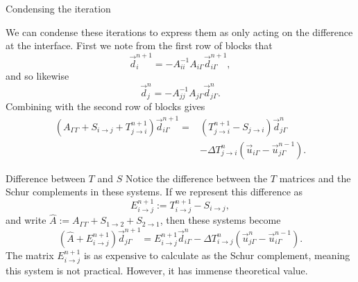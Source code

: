 \documentclass{beamer}
\begin{document}
\begin{frame}{Condensing the iteration}

We can condense these iterations to express them as only acting on the difference at the interface.
First we note from the first row of blocks that
\begin{equation*}
	\vec{d}_i^{n+1} = -A_{ii}^{-1} A_{i \Gamma} \vec{d}_{i \Gamma}^{n+1},
\end{equation*}
and so likewise
\begin{equation*}
	\vec{d}_j^{n} = -A_{jj}^{-1} A_{j \Gamma} \vec{d}_{j \Gamma}^{n}.
\end{equation*}
Combining with the second row of blocks gives
\begin{align*}
	\left ( A_{\Gamma \Gamma} + S_{i \to j} + T_{j \to i}^{n+1} \right ) \vec{d}_{i \Gamma}^{n+1} =
	& \left ( T_{j \to i}^{n+1} - S_{j \to i} \right ) \vec{d}_{j \Gamma}^n \\
	& - \Delta T_{j \to i}^n \left ( \vec{u}_{i \Gamma} - \vec{u}_{j \Gamma}^{n-1} \right ).
\end{align*}
\end{frame}

\begin{frame}{Difference between $T$ and $S$}
Notice the difference between the $T$ matrices and the Schur complements in these systems.
If we represent this difference as
\begin{equation*}
	E_{i \to j}^{n+1} := T_{i \to j}^{n+1} - S_{i \to j},
\end{equation*}
and write $\hat{A} := A_{\Gamma \Gamma} + S_{1 \to 2} + S_{2 \to 1}$, then these systems become
\begin{equation*}
	\left ( \hat{A} + E_{i \to j}^{n+1} \right ) \vec{d}_{j \Gamma}^{n+1} = E_{i \to j}^{n+1} \vec{d}_{i \Gamma}^n - \Delta T_{i \to j}^n \left ( \vec{u}_{j \Gamma}^n - \vec{u}_{i \Gamma}^{n-1} \right ).
\end{equation*}
The matrix $E_{i \to j}^{n+1}$ is as expensive to calculate as the Schur complement, meaning this system is not practical.
However, it has immense theoretical value.
\end{frame}
\end{document}
